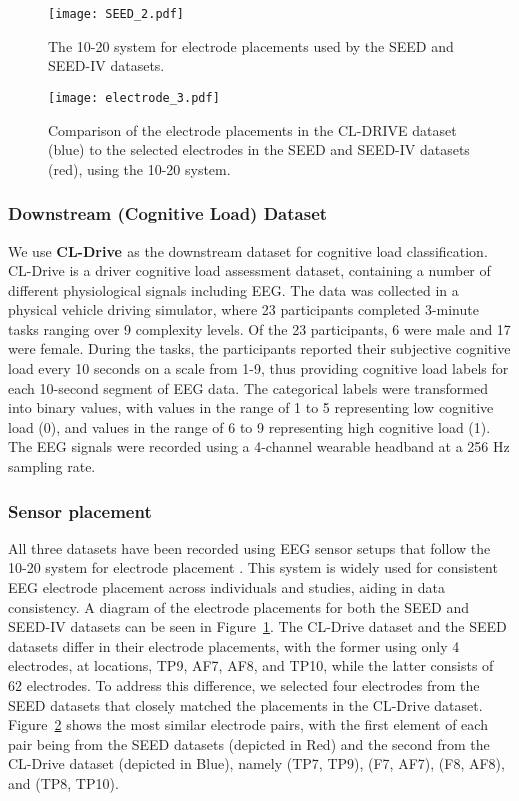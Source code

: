 \documentclass[sigconf]{acmart}
\begin{document}
\begin{figure}[t]
\centering
\texttt{[image: SEED\_2.pdf]}
\caption{The 10-20 system for electrode placements used by the SEED and SEED-IV datasets.}
\label{figSEED}
\end{figure}


\begin{figure}[t]
\centering
\texttt{[image: electrode\_3.pdf]}
\caption{Comparison of the electrode placements in the CL-DRIVE dataset (blue) to the selected electrodes in the SEED and SEED-IV datasets (red), using the 10-20 system.}
\label{figCOMPARE}
\end{figure}


\subsubsection{Downstream (Cognitive Load) Dataset}
We use \textbf{CL-Drive \cite{angkan2023multimodal}} as the downstream dataset for cognitive load classification. CL-Drive is a 
driver cognitive load assessment dataset, containing a number of different physiological signals including EEG. The data was collected in a physical vehicle driving simulator, where 23 participants completed 3-minute tasks ranging over 9 complexity levels. Of the 23 participants, 6 were male and 17 were female. During the tasks, the participants reported their subjective cognitive load every 10 seconds on a scale from 1-9, thus providing cognitive load labels for each 10-second segment of EEG data. The categorical labels were transformed into binary values, with values in the range of 1 to 5 representing low cognitive load (0), and values in the range of 6 to 9 representing high cognitive load (1). The EEG signals were recorded using a 4-channel wearable headband at a 256 Hz sampling rate.


\subsubsection{Sensor placement}\label{sensorPlacement}
All three datasets have been recorded using EEG sensor setups that follow the 10-20 system for electrode placement \cite{morley201610}. This system is widely used for consistent EEG electrode placement across individuals and studies, aiding in data consistency. A diagram of the electrode placements for both the SEED and SEED-IV datasets can be seen in Figure~\ref{figSEED}. The CL-Drive dataset and the SEED datasets differ in their electrode placements, with the former using only 4 electrodes, at locations, TP9, AF7, AF8, and TP10, while the latter consists of 62 electrodes. To address this difference, we selected four electrodes from the SEED datasets that closely matched the placements in the CL-Drive dataset. Figure~\ref{figCOMPARE} shows the most similar electrode pairs, with the first element of each pair being from the SEED datasets (depicted in Red) and the second from the CL-Drive dataset (depicted in Blue), namely (TP7, TP9), (F7, AF7), (F8, AF8), and (TP8, TP10). 
\end{document}
